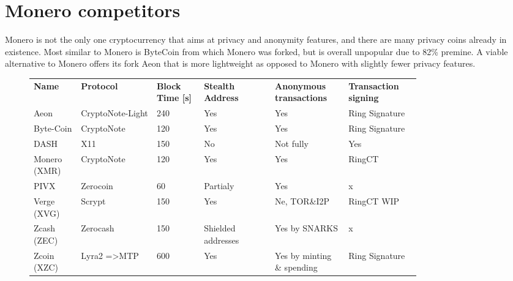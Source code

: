 \documentclass[
  printed, %
  table,   %
  nolof,     %
  nolot,     %
           oneside, color
]{fithesis3}
\begin{document}
\section{Monero competitors}
\label{sec:monero-timeline}
Monero is not the only one cryptocurrency that aims at privacy and anonymity features, and there are many privacy coins already in existence. Most similar to Monero is ByteCoin from which Monero was forked, but is overall unpopular due to 82\% premine.  A viable alternative to Monero offers its fork Aeon that is more lightweight as opposed to Monero with slightly fewer privacy features.

\begin{figure}[H]
\centering
\begin{tabular}{p{0.1\linewidth}p{0.16\linewidth}p{0.1\linewidth}p{0.15\linewidth}p{0.15\linewidth}p{0.15\linewidth}}
\textbf{Name}        & \textbf{Protocol}                & \textbf{Block Time {[}s{]}} & \textbf{Stealth Address    }      & \textbf{Anonymous transactions} & \textbf{Transaction signing}  \\
Aeon         & CryptoNote-Light        & 240                & Yes                      & Yes                & Ring Signature \\
Byte-Coin     & CryptoNote              & 120                & Yes                      & Yes                & Ring Signature \\
DASH         & X11                     & 150                & No                       & Not fully           & Yes            \\
Monero (XMR) & CryptoNote              & 120                & Yes                      & Yes                & RingCT         \\
PIVX         & Zerocoin                & 60                 & Partialy & Yes                & x              \\
Verge (XVG)  & Scrypt                  & 150                & Yes                      & Ne, TOR\&I2P       & RingCT WIP     \\
Zcash (ZEC)  & Zerocash                & 150                & Shielded addresses  & Yes by SNARKS    & x              \\
Zcoin (XZC)  & Lyra2 =\textgreater MTP & 600                & Yes                      & Yes by minting \& spending  & Ring Signature

\end{tabular}
\label{table:monero-alternatives}


\end{figure}
\end{document}
